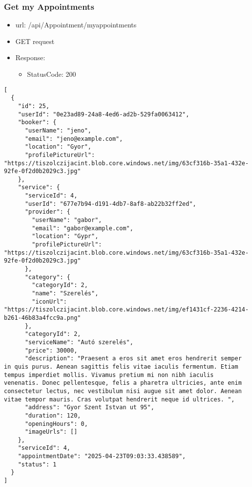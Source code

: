 \documentclass[11pt]{article}
\begin{document}
\subsubsection{Get my Appointments}
\label{sec:orgccf9fa8}
\begin{itemize}
\item url: /api/Appointment/myappointments
\item GET request
\item Response:
\begin{itemize}
\item StatusCode: 200
\end{itemize}
\end{itemize}
\begin{verbatim}
[
  {
    "id": 25,
    "userId": "0e23ad89-24a8-4ed6-ad2b-529fa0063412",
    "booker": {
      "userName": "jeno",
      "email": "jeno@example.com",
      "location": "Gyor",
      "profilePictureUrl": "https://tiszolczijacint.blob.core.windows.net/img/63cf316b-35a1-432e-92fe-0f2d0b2029c3.jpg"
    },
    "service": {
      "serviceId": 4,
      "userId": "677e7b94-d191-4db7-8af8-ab22b32ff2ed",
      "provider": {
        "userName": "gabor",
        "email": "gabor@example.com",
        "location": "Gypr",
        "profilePictureUrl": "https://tiszolczijacint.blob.core.windows.net/img/63cf316b-35a1-432e-92fe-0f2d0b2029c3.jpg"
      },
      "category": {
        "categoryId": 2,
        "name": "Szerelés",
        "iconUrl": "https://tiszolczijacint.blob.core.windows.net/img/ef1431cf-2236-4214-b261-46b83a4fcc9a.png"
      },
      "categoryId": 2,
      "serviceName": "Autó szerelés",
      "price": 30000,
      "description": "Praesent a eros sit amet eros hendrerit semper in quis purus. Aenean sagittis felis vitae iaculis fermentum. Etiam tempus imperdiet mollis. Vivamus pretium mi non nibh iaculis venenatis. Donec pellentesque, felis a pharetra ultricies, ante enim consectetur lectus, nec vestibulum nisi augue sit amet dolor. Aenean vitae tempor mauris. Cras volutpat hendrerit neque id ultrices. ",
      "address": "Gyor Szent Istvan ut 95",
      "duration": 120,
      "openingHours": 0,
      "imageUrls": []
    },
    "serviceId": 4,
    "appointmentDate": "2025-04-23T09:03:33.438589",
    "status": 1
  }
]
\end{verbatim}
\end{document}
